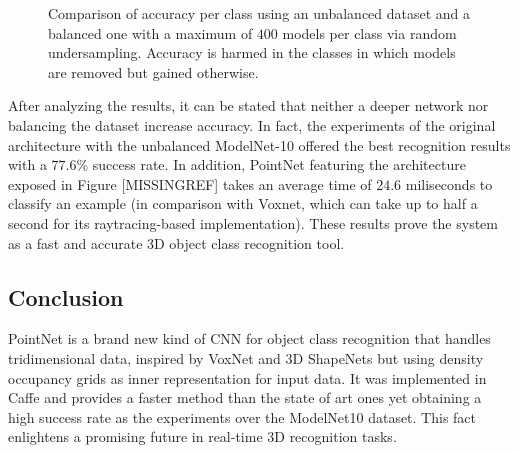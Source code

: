 \begin{figure}[!htb]
    \centering
    \caption{Comparison of accuracy per class using an unbalanced dataset and a balanced one with a maximum of $400$ models per class via random undersampling. Accuracy is harmed in the classes in which models are removed but gained otherwise.}
    \label{fig:objrecog:balunbal}
\end{figure}

After analyzing the results, it can be stated that neither a deeper network nor balancing the dataset increase accuracy. In fact, the experiments of the original architecture with the unbalanced ModelNet-10 offered the best recognition results with a $77.6$\% success rate. In addition, PointNet featuring the architecture exposed in Figure [MISSINGREF] takes an average time of $24.6$ miliseconds to classify an example (in comparison with Voxnet, which can take up to half a second for its raytracing-based implementation). These results prove the system as a fast and accurate 3D object class recognition tool.

\subsection{Conclusion}
\label{cha:objrecog:sec:pointnet:subsec:conclusion}

PointNet is a brand new kind of CNN for object class recognition that handles tridimensional data, inspired by VoxNet and 3D ShapeNets but using density occupancy grids as inner representation for input data. It was implemented in Caffe and provides a faster method than the state of art ones yet obtaining a high success rate as the experiments over the ModelNet10 dataset. This fact enlightens a promising future in real-time 3D recognition tasks.

